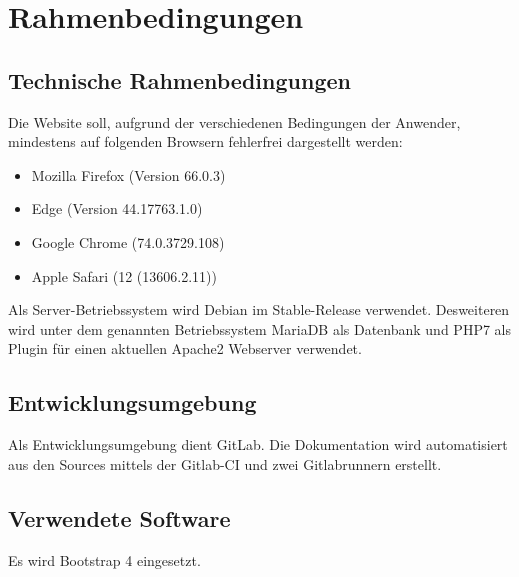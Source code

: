 \chapter{Rahmenbedingungen}


\section{Technische Rahmenbedingungen}
Die Website soll, aufgrund der verschiedenen Bedingungen der Anwender, mindestens auf folgenden Browsern fehlerfrei dargestellt werden:
\begin{itemize}
\item Mozilla Firefox (Version 66.0.3)
\item Edge (Version 44.17763.1.0)
\item Google Chrome (74.0.3729.108)
\item Apple Safari (12 (13606.2.11))
\end{itemize}
\vspace{\baselineskip}
Als Server-Betriebssystem wird Debian im Stable-Release verwendet. Desweiteren wird unter dem genannten Betriebssystem MariaDB als Datenbank und PHP7 als Plugin für einen aktuellen Apache2 Webserver verwendet.

\section{Entwicklungsumgebung}
Als Entwicklungsumgebung dient GitLab. Die Dokumentation wird automatisiert aus den Sources mittels der Gitlab-CI und zwei Gitlabrunnern erstellt.

\section{Verwendete Software}
Es wird Bootstrap 4 eingesetzt.
